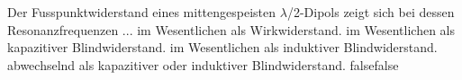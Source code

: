     {Der Fusspunktwiderstand eines mittengespeisten $\lambda$/2-Dipols zeigt sich bei dessen Resonanzfrequenzen ...}
    {im Wesentlichen als Wirkwiderstand.}
    {im Wesentlichen als kapazitiver Blindwiderstand.}
    {im Wesentlichen als induktiver Blindwiderstand.}
    {abwechselnd als kapazitiver oder induktiver Blindwiderstand.}
    {false}{false}